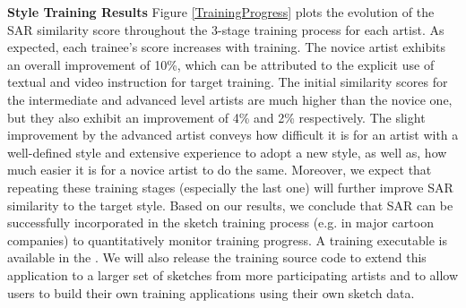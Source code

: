 

\textbf{Style Training Results} Figure \ref{TrainingProgress} plots the evolution of the SAR similarity score throughout the 3-stage training process for each artist. As expected, each trainee's score increases with training. The novice artist exhibits an overall improvement of 10\%, which can be attributed to the explicit use of textual and video instruction for target training. The initial similarity scores for the intermediate and advanced level artists are much higher than the novice one, but they also exhibit an improvement of 4\% and 2\% respectively. The slight improvement by the advanced artist conveys how difficult it is for an artist with a well-defined style and extensive experience to adopt a new style, as well as, how much easier it is for a novice artist to do the same. Moreover, we expect that repeating these training stages (especially the last one) will further improve SAR similarity to the target style. Based on our results, we conclude that SAR can be successfully incorporated in the sketch training process (e.g. in major cartoon companies) to quantitatively monitor training progress. A training executable is available in the . We will also release the training source code to extend this application to a larger set of sketches from more participating artists and to allow users to build their own training applications using their own sketch data.




